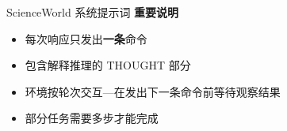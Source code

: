 \begin{figure}[!htbp]
\begin{paperbox}{ScienceWorld 系统提示词}
\vspace{0.2cm}
\textbf{重要说明}
\begin{itemize}
\item 每次响应只发出\textbf{一条}命令
\item 包含解释推理的 THOUGHT 部分
\item 环境按轮次交互---在发出下一条命令前等待观察结果
\item 部分任务需要多步才能完成
\end{itemize}
\end{paperbox}
\end{figure}

